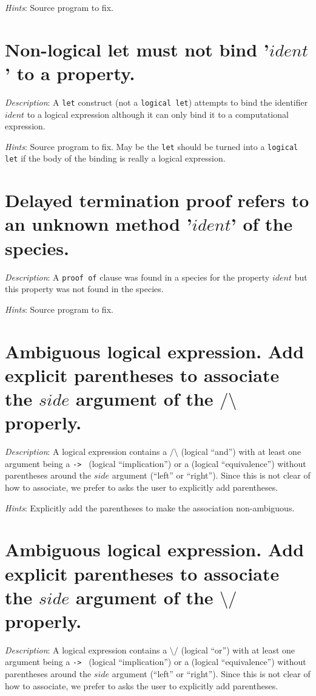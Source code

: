 {\em Hints}: Source program to fix.



\section*{Non-logical let must not bind '$ident$' to a property.}
{\em Description}: A {\tt let} construct (not a {\tt logical let})
attempts to bind the identifier $ident$ to a logical expression
although it can only bind it to a computational expression.

{\em Hints}: Source program to fix. May be the {\tt let} should be
turned into a {\tt logical let} if the body of the binding is really a
logical expression.



\section*{Delayed termination proof refers to an unknown method
  '$ident$' of the species.}
{\em Description}: A {\tt proof of} clause was found in a species for
the property $ident$ but this property was not found in the species.

{\em Hints}: Source program to fix.



\section*{Ambiguous logical expression. Add explicit parentheses to
  associate the $side$ argument of the $/\setminus$ properly.}
{\em Description}: A logical expression contains a
{\tt $/\setminus$} (logical ``and'') with at least one argument being a
{\tt -> } (logical ``implication'') or a {\tt <->} (logical
``equivalence'') without parentheses around the $side$ argument (``left''
or ``right''). Since this is not clear of how to associate, we prefer
to asks the user to explicitly add parentheses.

{\em Hints}: Explicitly add the parentheses to make the association
non-ambiguous.



\section*{Ambiguous logical expression. Add explicit parentheses to
  associate the $side$ argument of the {\tt $\setminus/$} properly.}
{\em Description}: A logical expression contains a
{\tt $\setminus/$} (logical ``or'') with at least one argument being a
{\tt -> } (logical ``implication'') or a {\tt <->} (logical
``equivalence'') without parentheses around the $side$ argument (``left''
or ``right''). Since this is not clear of how to associate, we prefer
to asks the user to explicitly add parentheses.

